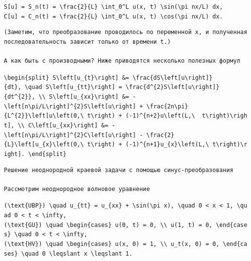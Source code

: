 \documentclass[
  ukrainian,
]{article}
\begin{document}
\texttt{S{[}u{]}\ =\ S\_n(t)\ =\ \textbackslash{}frac\{2\}\{L\}\ \textbackslash{}int\_0\^{}L\ u(x,\ t)\ \textbackslash{}sin(\textbackslash{}pi\ nx/L)\ dx,}
\texttt{C{[}u{]}\ =\ C\_n(t)\ =\ \textbackslash{}frac\{2\}\{L\}\ \textbackslash{}int\_0\^{}L\ u(x,\ t)\ \textbackslash{}cos(\textbackslash{}pi\ nx/L)\ dx.}

\begin{verbatim}
(Заметим, что преобразование проводилось по переменной x, и полученная последовательность зависит только от времени t.)

А как быть с производными? Ниже приводятся несколько полезных формул
\end{verbatim}

\texttt{\textbackslash{}begin\{split\}\ S\textbackslash{}left{[}u\_\{t\}\textbackslash{}right{]}\ \&=\ \textbackslash{}frac\{dS\textbackslash{}left{[}u\textbackslash{}right{]}\}\{dt\},\ \textbackslash{}quad\ S\textbackslash{}left{[}u\_\{tt\}\textbackslash{}right{]}\ =\ \textbackslash{}frac\{d\^{}\{2\}S\textbackslash{}left{[}u\textbackslash{}right{]}\}\{dt\^{}\{2\}\},\ \textbackslash{}\textbackslash{}\ S\textbackslash{}left{[}u\_\{xx\}\textbackslash{}right{]}\ \&=\ -\textbackslash{}left{[}n\textbackslash{}pi/L\textbackslash{}right{]}\^{}\{2\}S\textbackslash{}left{[}u\textbackslash{}right{]}\ +\ \textbackslash{}frac\{2n\textbackslash{}pi\}\{L\^{}\{2\}\}\textbackslash{}left{[}u\textbackslash{}left(0,\textbackslash{}\ t\textbackslash{}right)\ +\ (-1)\^{}\{n+2\}u\textbackslash{}left(L,\textbackslash{}\ \ t\textbackslash{}right)\textbackslash{}right{]},\ \textbackslash{}\textbackslash{}\ C\textbackslash{}left{[}u\_\{xx\}\textbackslash{}right{]}\ \&=\ -\textbackslash{}left{[}n\textbackslash{}pi/L\textbackslash{}right{]}\^{}\{2\}C\textbackslash{}left{[}u\textbackslash{}right{]}\ -\ \textbackslash{}frac\{2\}\{L\}\textbackslash{}left{[}u\_\{x\}\textbackslash{}left(0,\textbackslash{}\ t\textbackslash{}right)\ +\ (-1)\^{}\{n+1\}u\_\{x\}\textbackslash{}left(L,\textbackslash{}\ t\textbackslash{}right)\textbackslash{}right{]}.\ \textbackslash{}end\{split\}}

\begin{verbatim}
Решение неоднородной краевой задачи с помощью синус-преобразования

Рассмотрим неоднородное волновое уравнение
\end{verbatim}

\texttt{(\textbackslash{}text\{UBP\})\ \textbackslash{}quad\ u\_\{tt\}\ =\ u\_\{xx\}\ +\ \textbackslash{}sin(\textbackslash{}pi\ x),\ \textbackslash{}quad\ 0\ \textless{}\ x\ \textless{}\ 1,\ \textbackslash{}quad\ 0\ \textless{}\ t\ \textless{}\ \textbackslash{}infty,}
\texttt{(\textbackslash{}text\{GU\})\ \textbackslash{}quad\ \textbackslash{}begin\{cases\}\ u(0,\ t)\ =\ 0,\ \textbackslash{}\textbackslash{}\ u(1,\ t)\ =\ 0,\ \textbackslash{}end\{cases\}\ \textbackslash{}quad\ 0\ \textless{}\ t\ \textless{}\ \textbackslash{}infty,}
\texttt{(\textbackslash{}text\{HV\})\ \textbackslash{}quad\ \textbackslash{}begin\{cases\}\ u(x,\ 0)\ =\ 1,\ \textbackslash{}\textbackslash{}\ u\_t(x,\ 0)\ =\ 0,\ \textbackslash{}end\{cases\}\ \textbackslash{}quad\ 0\ \textbackslash{}leqslant\ x\ \textbackslash{}leqslant\ 1.}
\end{document}
